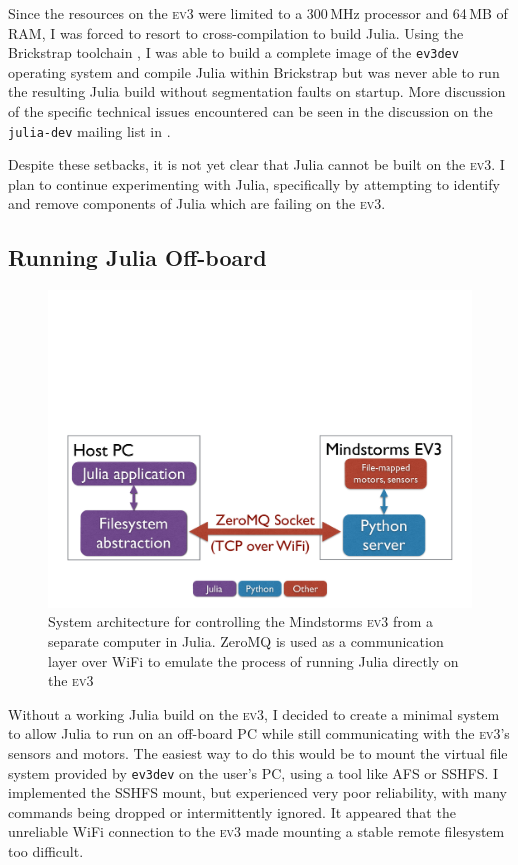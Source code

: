 \documentclass[]{article}
\newcommand{\ev}{\textsc{ev3}}
\begin{document}
Since the resources on the \ev{} were limited to a 300\,MHz processor and 64\,MB of RAM, I was forced to resort to cross-compilation to build Julia. Using the Brickstrap toolchain \cite{_brickstrap_2015}, I was able to build a complete image of the \texttt{ev3dev} operating system and compile Julia within Brickstrap but was never able to run the resulting Julia build without segmentation faults on startup. More discussion of the specific technical issues encountered can be seen in the discussion on the \texttt{julia-dev} mailing list in \cite{deits_building_2015}. 

Despite these setbacks, it is not yet clear that Julia cannot be built on the \ev{}. I plan to continue experimenting with Julia, specifically by attempting to identify and remove components of Julia which are failing on the \ev{}. 

\subsection{Running Julia Off-board}

\begin{figure}[thpb]
\centering
    \includegraphics[width=\textwidth, clip=true, trim=0 0 0 4.5in]{fig/offboard_arch.pdf}
    \caption{System architecture for controlling the Mindstorms \ev{} from a separate computer in Julia. ZeroMQ is used as a communication layer over WiFi to emulate the process of running Julia directly on the \ev{}}
    \label{fig:offboard}
\end{figure}

Without a working Julia build on the \ev{}, I decided to create a minimal system to allow Julia to run on an off-board PC while still communicating with the \ev{}'s sensors and motors. The easiest way to do this would be to mount the virtual file system provided by \texttt{ev3dev} on the user's PC, using a tool like AFS or SSHFS. I implemented the SSHFS mount, but experienced very poor reliability, with many commands being dropped or intermittently ignored. It appeared that the unreliable WiFi connection to the \ev{} made mounting a stable remote filesystem too difficult. 
\end{document}

